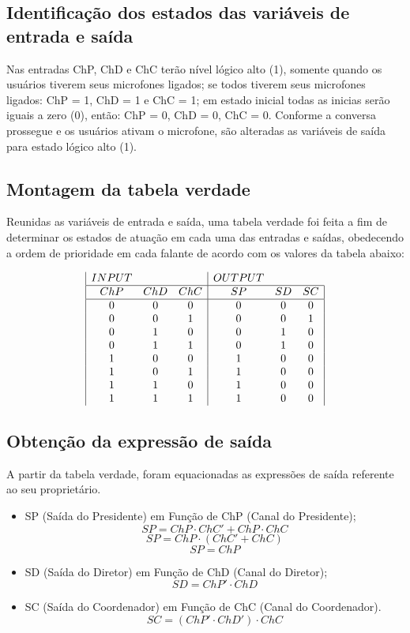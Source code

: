 \documentclass{article}
\begin{document}
\subsection{Identificação dos estados das variáveis de entrada e saída}
Nas entradas ChP, ChD e ChC terão nível lógico alto (1), somente quando os usuários tiverem seus microfones ligados; se todos tiverem seus microfones ligados: ChP = 1, ChD = 1 e ChC = 1; em estado inicial todas as inicias serão iguais a zero (0), então: ChP = 0, ChD = 0, ChC = 0. Conforme a conversa prossegue e os usuários ativam o microfone, são alteradas as variáveis de saída para estado lógico alto (1).

\subsection{Montagem da tabela verdade}
Reunidas as variáveis de entrada e saída, uma tabela verdade foi feita a fim de determinar os estados de atuação em cada uma das entradas e saídas, obedecendo a ordem de prioridade em cada falante de acordo com os valores da tabela abaixo:

\begin{displaymath}
\begin{array}{|c c c|c c c|}
INPUT & & & OUTPUT &\\
\hline
ChP & ChD & ChC & SP & SD & SC\\
\hline %
0 & 0 & 0 & 0 & 0 & 0\\
0 & 0 & 1 & 0 & 0 & 1\\
0 & 1 & 0 & 0 & 1 & 0\\
0 & 1 & 1 & 0 & 1 & 0\\
1 & 0 & 0 & 1 & 0 & 0\\
1 & 0 & 1 & 1 & 0 & 0\\
1 & 1 & 0 & 1 & 0 & 0\\
1 & 1 & 1 & 1 & 0 & 0\\
\end{array}
\end{displaymath}

\subsection{Obtenção da expressão de saída}
A partir da tabela verdade, foram equacionadas as expressões de saída referente ao seu proprietário.

\begin{itemize}
	\item SP (Saída do Presidente) em Função de ChP (Canal do Presidente);
		\[SP=ChP\cdot ChC' + ChP\cdot ChC\]
		\[SP=ChP\cdot (ChC' + ChC)\]
		\[SP=ChP\]
	\item SD (Saída do Diretor) em Função de ChD (Canal do Diretor);
		\[SD=ChP'\cdot ChD\]
	\item SC (Saída do Coordenador) em Função de ChC (Canal do Coordenador).
		\[SC=(ChP'\cdot ChD')\cdot ChC\]
\end{itemize}
\end{document}
